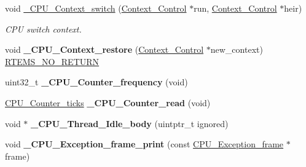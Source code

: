 \begin{DoxyCompactItemize}
\item 
\mbox{\label{group__RTEMSScoreCPUARM_gaa9f8cc989454b28232e5375e30c90970}} 
void \mbox{\hyperlink{group__RTEMSScoreCPUARM_gaa9f8cc989454b28232e5375e30c90970}{\+\_\+\+C\+P\+U\+\_\+\+Context\+\_\+switch}} (\mbox{\hyperlink{structContext__Control}{Context\+\_\+\+Control}} $\ast$run, \mbox{\hyperlink{structContext__Control}{Context\+\_\+\+Control}} $\ast$heir)
\begin{DoxyCompactList}\small\item\em C\+PU switch context. \end{DoxyCompactList}\item 
\mbox{\label{group__RTEMSScoreCPUARM_ga80726ebfe00f31a88b086cc4474c472f}} 
void {\bfseries \+\_\+\+C\+P\+U\+\_\+\+Context\+\_\+restore} (\mbox{\hyperlink{structContext__Control}{Context\+\_\+\+Control}} $\ast$new\+\_\+context) \mbox{\hyperlink{group__RTEMSScoreBaseDefs_gaa2f0ed67aa174f684bb31b7e8bdb386f}{R\+T\+E\+M\+S\+\_\+\+N\+O\+\_\+\+R\+E\+T\+U\+RN}}
\item 
\mbox{\label{group__RTEMSScoreCPUARM_gaa675150e5d00169c99410a82011b6117}} 
uint32\+\_\+t {\bfseries \+\_\+\+C\+P\+U\+\_\+\+Counter\+\_\+frequency} (void)
\item 
\mbox{\label{group__RTEMSScoreCPUARM_gac016ae4ed92ed2607bd65408a36d908b}} 
\mbox{\hyperlink{no__cpu_2include_2rtems_2score_2cpu_8h_a67f8550aad58bccb6fcb4589894444ad}{C\+P\+U\+\_\+\+Counter\+\_\+ticks}} {\bfseries \+\_\+\+C\+P\+U\+\_\+\+Counter\+\_\+read} (void)
\item 
\mbox{\label{group__RTEMSScoreCPUARM_ga903a802003c95d6ef5206cb330424a1b}} 
void $\ast$ {\bfseries \+\_\+\+C\+P\+U\+\_\+\+Thread\+\_\+\+Idle\+\_\+body} (uintptr\+\_\+t ignored)
\item 
\mbox{\label{group__RTEMSScoreCPUARM_gaa34a35de496258577c1454ba1ee07ce0}} 
void {\bfseries \+\_\+\+C\+P\+U\+\_\+\+Exception\+\_\+frame\+\_\+print} (const \mbox{\hyperlink{structCPU__Exception__frame}{C\+P\+U\+\_\+\+Exception\+\_\+frame}} $\ast$frame)
\item 
\mbox{\label{group__RTEMSScoreCPUARM_ga286e88dc9f8142e9eba190afcdf6c2b4}} 

\end{DoxyCompactItemize}
